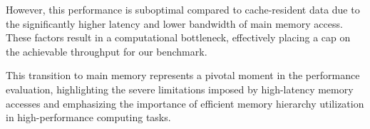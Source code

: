 \documentclass{article}
\begin{document}
However, this performance is suboptimal compared to cache-resident data due to the significantly higher latency and lower bandwidth of main memory access. These factors result in a computational bottleneck, effectively placing a cap on the achievable throughput for our benchmark.

This transition to main memory represents a pivotal moment in the performance evaluation, highlighting the severe limitations imposed by high-latency memory accesses and emphasizing the importance of efficient memory hierarchy utilization in high-performance computing tasks.
\end{document}
